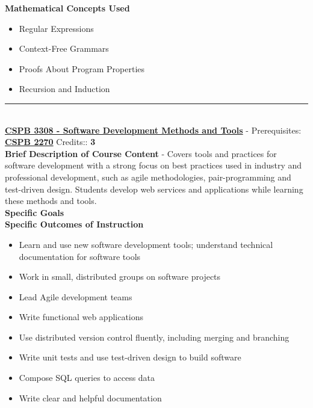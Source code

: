 \documentclass{article}
\newcommand{\horizontalline}{\noindent \rule{\textwidth}{0.5pt} \\}
\begin{document}
\noindent \textbf{Mathematical Concepts Used}
\begin{itemize}
    \item Regular Expressions
    \item Context-Free Grammars
    \item Proofs About Program Properties
    \item Recursion and Induction
\end{itemize}
\horizontalline
\noindent \href{https://www.colorado.edu/program/cspb/cspb-3308-software-development-methods-and-tools}{\textbf{CSPB 3308 - Software Development Methods and Tools}} - Prerequisites: \href{https://www.colorado.edu/program/cspb/cspb-2270-computer-science-2-data-structures}{\textbf{CSPB 2270}} Credits:: \textbf{3} \\

\noindent \textbf{Brief Description of Course Content} - Covers tools and practices for software development with a strong focus on best practices used in industry and professional development, such as agile methodologies, pair-programming and test-driven design. Students develop web services and applications while learning these methods and tools. \\

\noindent \textbf{Specific Goals} \\

\noindent \textbf{Specific Outcomes of Instruction}
\begin{itemize}
    \item Learn and use new software development tools; understand technical documentation for software tools
    \item Work in small, distributed groups on software projects
    \item Lead Agile development teams
    \item Write functional web applications
    \item Use distributed version control fluently, including merging and branching
    \item Write unit tests and use test-driven design to build software
    \item Compose SQL queries to access data
    \item Write clear and helpful documentation
\end{itemize}
\end{document}
